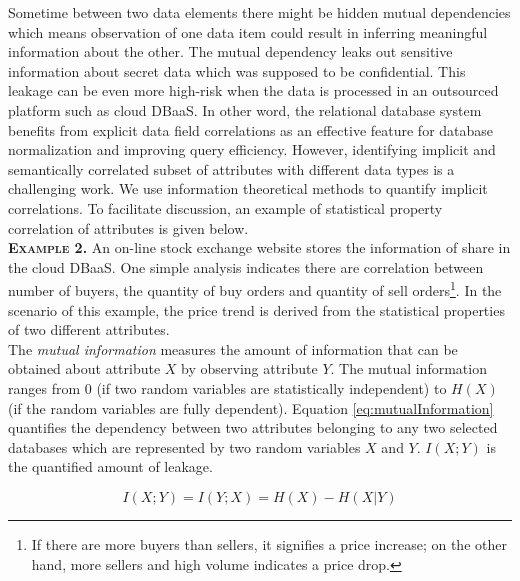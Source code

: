  Sometime between two data elements there might be hidden mutual dependencies which means observation of one data item could result in inferring meaningful information about the other. The mutual dependency leaks out sensitive information about secret data which was supposed to be confidential. This leakage can be even more high-risk when the data is processed in an outsourced platform such as cloud DBaaS. In other word, the relational database system benefits from explicit data field correlations as an effective feature for database normalization and improving query efficiency. However, identifying implicit and semantically correlated subset of attributes with different data types is a challenging work. We use information theoretical methods to quantify implicit correlations. To facilitate discussion, an example of statistical property correlation of attributes is given below.\\


\noindent\textbf{\textsc{Example 2.}} An on-line stock exchange website stores the information of share in the cloud DBaaS. One simple analysis indicates there are correlation between number of buyers, the quantity of buy orders and quantity of sell orders\footnote{If there are more buyers than sellers, it signifies a price increase; on the other hand, more sellers and high volume indicates a price drop. }. In the scenario of this example, the price trend is derived from the statistical properties of two different attributes.\\

\noindent The {\it mutual information} measures the amount of information that can be obtained about attribute $X$ by observing attribute $Y$. The mutual information ranges from $0$ (if two random variables are statistically independent) to $H(X)$ (if the random variables are fully dependent). Equation \ref{eq:mutualInformation} quantifies the dependency between two attributes belonging to any two selected databases which are represented by two random variables $X$ and $Y$. $I(X; Y)$ is the quantified amount of leakage.

\begin{equation} 
\label{eq:mutualInformation}
I(X; Y ) = I(Y; X)=H(X)-H(X|Y)
\end{equation} 

